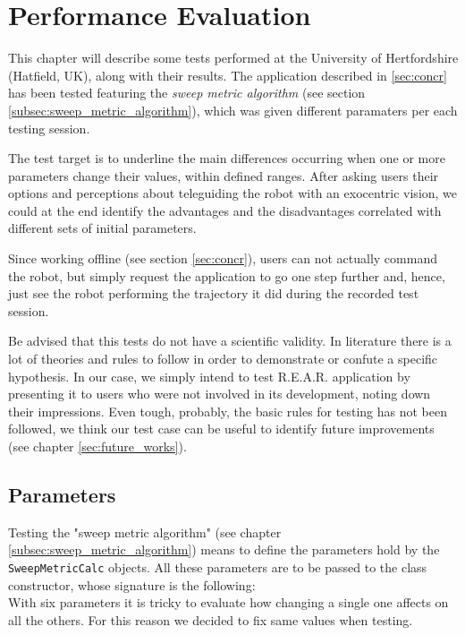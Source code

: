 \section{Performance Evaluation}
\label{sec:performance_evaluation}
%
This chapter will describe some tests performed at the University of Hertfordshire
(Hatfield, UK), along with their results. 
%
The application described in \ref{sec:concr} has been tested 
featuring the \textit{sweep metric algorithm} (see section 
\ref{subsec:sweep_metric_algorithm}), which was 
given different paramaters per each testing session.
%

%
The test target is to underline the main differences 
occurring when one or more parameters change their values, 
within defined ranges. After asking users their options and perceptions
about teleguiding the robot with an exocentric vision, we could at the end identify the advantages
and the disadvantages correlated with different sets of initial parameters.
%

%
Since working offline (see section \ref{sec:concr}), users can not actually 
command the robot, but simply request the application to go one step
further and, hence, just see the robot performing the trajectory 
it did during the recorded test session.
%

%
Be advised that this tests do not have a scientific validity. In literature there is a lot of theories
and rules to follow in order to demonstrate or confute a specific hypothesis. In our case, we simply
intend to test R.E.A.R. application by presenting it to users who were not involved in its development,
noting down their impressions. Even tough, probably, the basic rules for testing has not been followed,
we think our test case can be useful to identify future improvements (see chapter \ref{sec:future_works}).

\subsection{Parameters}
\label{subsec:parameters}

Testing the "sweep metric algorithm" (see chapter \ref{subsec:sweep_metric_algorithm}) means to define
the parameters hold by the \texttt{SweepMetricCalc} objects. All these parameters are 
to be passed to the class constructor, whose signature is the following:
\\
With six parameters it is tricky to evaluate how changing a single one affects on all the others. For this
reason we decided to fix same values when testing.
%

